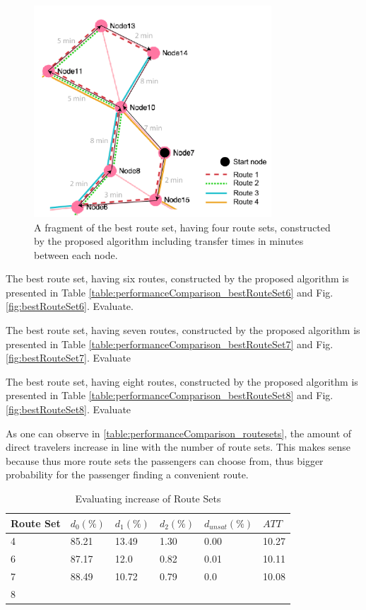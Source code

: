 \begin{figure}[H]
    \begin{center}
    \includegraphics[width=3.5in]{assets/mandl_withTT_utsnitt.png}
    \end{center}
    \caption{A fragment of the best route set, having four route sets, constructed by the proposed algorithm including transfer times in minutes between each node.}
    \label{fig:mandlWithTT} 
\end{figure}

The best route set, having six routes, constructed by the proposed algorithm is presented in Table \vref{table:performanceComparison_bestRouteSet6} and Fig. \vref{fig:bestRouteSet6}. 
Evaluate.

The best route set, having seven routes, constructed by the proposed algorithm is presented in Table \vref{table:performanceComparison_bestRouteSet7} and Fig. \vref{fig:bestRouteSet7}. 
Evaluate

The best route set, having eight routes, constructed by the proposed algorithm is presented in Table \vref{table:performanceComparison_bestRouteSet8} and Fig. \vref{fig:bestRouteSet8}.
Evaluate

As one can observe in \vref{table:performanceComparison_routesets}, the amount of direct travelers increase in line with the number of route sets. This makes sense because thus more route sets the passengers can choose from, thus bigger probability for the passenger finding a convenient route. %

 \begin{table}[H]
    \centering
    \begin{tabular}{|l||l|l|l|l|l|}
    \hline
    Route Set & $d_0(\%)$ & $d_1(\%)$ & $d_2(\%)$ & $d_{unsat}(\%)$ & $ATT$ \\
    \hline
    4 & 85.21 & 13.49 & 1.30 & 0.00 & 10.27\\
    6 & 87.17 & 12.0 & 0.82 & 0.01 & 10.11\\
    7 & 88.49 & 10.72 & 0.79 & 0.0 & 10.08\\
    8\\
    \hline
    \end{tabular}
    \caption {Evaluating increase of Route Sets}
    \label{table:performanceComparison_routesets}
\end{table}

